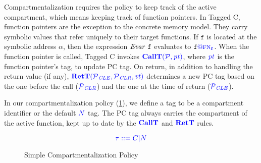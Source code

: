 \documentclass{llncs}
\begin{document}
Compartmentalization requires the policy to keep track of the active compartment, which means
keeping track of function pointers. In Tagged C, function pointers are the exception to the
concrete memory model. They carry symbolic values that refer uniquely to their target functions.
If \(\mathtt{f}\) is located at the symbolic address \(\alpha\), then
the expression \(\var{\mathtt{f}}\) evaluates to \(\mathtt{f}\tagat\FN[f]\).
When the function pointer is called, Tagged C invokes \(\callt\), where \(\pt\) is the
function pointer's tag, to update PC tag.
On return, in addition to handling the return value (if any), \(\rett\) determines a new PC tag
based on the one before the call (\(\PCT[_{CLR}]\)) and the one at the time of return (\(\PCT[_{CLE}]\)).

In our compartmentalization policy (\cref{fig:compartments}), we define a tag to be a compartment
identifier or the default \(\N\) tag. The PC tag always carries the compartment of the
active function, kept up to date by the \(\calltname\) and \(\rettname\) rules.

\begin{figure}
  \scriptsize
  \color{blue}
  \begin{minipage}[t]{0.4\textwidth}
    \vspace{-3em}
    \[\color{blue} \tau ::= C | \N\]

  
  \end{minipage}
  \begin{minipage}[t]{0.25\textwidth}
  \end{minipage}
  \begin{minipage}[t]{0.25\textwidth}
    
  \end{minipage}
    
  \caption{Simple Compartmentalization Policy}
  \label{fig:compartments}
\end{figure}
\end{document}
